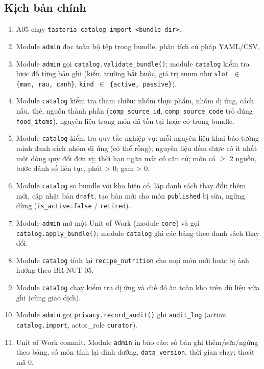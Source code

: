 \subsection{Kịch bản chính}
\begin{enumerate}
\item A05 chạy {\small\texttt{tastoria catalog import <bundle\_\allowbreak{}\allowbreak{}dir>}}.
\item Module {\small\texttt{admin}} đọc toàn bộ tệp trong bundle, phân tích cú pháp YAML/\allowbreak{}CSV.
\item Module {\small\texttt{admin}} gọi {\small\texttt{catalog.\allowbreak{}validate\_\allowbreak{}\allowbreak{}bundle()}}; module {\small\texttt{catalog}} kiểm tra lược đồ từng bản ghi (kiểu, trường bắt buộc, giá trị enum như {\small\texttt{slot \ensuremath{\in} \{man, rau, canh\}}}, {\small\texttt{kind \ensuremath{\in} \{active, passive\}}}).
\item Module {\small\texttt{catalog}} kiểm tra tham chiếu: nhóm thực phẩm, nhóm dị ứng, cách nấu, thẻ, nguồn thành phần ({\small\texttt{comp\_\allowbreak{}\allowbreak{}source\_\allowbreak{}\allowbreak{}id}}, {\small\texttt{comp\_\allowbreak{}\allowbreak{}source\_\allowbreak{}\allowbreak{}code}} trỏ đúng {\small\texttt{food\_\allowbreak{}\allowbreak{}items}}), nguyên liệu trong món đã tồn tại hoặc có trong bundle.
\item Module {\small\texttt{catalog}} kiểm tra quy tắc nghiệp vụ: mỗi nguyên liệu khai báo tường minh danh sách nhóm dị ứng (có thể rỗng); nguyên liệu đếm được có ít nhất một dòng quy đổi đơn vị; thời hạn ngăn mát có căn cứ; món có \ensuremath{\geq} 2 nguồn, bước đánh số liên tục, phút > 0; gam > 0.
\item Module {\small\texttt{catalog}} so bundle với kho hiện có, lập danh sách thay đổi: thêm mới, cập nhật bản {\small\texttt{draft}}, tạo bản mới cho món {\small\texttt{published}} bị sửa, ngừng dùng ({\small\texttt{is\_\allowbreak{}\allowbreak{}active=false}} /\allowbreak{} {\small\texttt{retired}}).
\item Module {\small\texttt{admin}} mở một Unit of Work (module {\small\texttt{core}}) và gọi {\small\texttt{catalog.\allowbreak{}apply\_\allowbreak{}\allowbreak{}bundle()}}; module {\small\texttt{catalog}} ghi các bảng theo danh sách thay đổi.
\item Module {\small\texttt{catalog}} tính lại {\small\texttt{recipe\_\allowbreak{}\allowbreak{}nutrition}} cho mọi món mới hoặc bị ảnh hưởng theo BR-\allowbreak{}NUT-\allowbreak{}05.
\item Module {\small\texttt{catalog}} chạy kiểm tra dị ứng và chế độ ăn toàn kho trên dữ liệu vừa ghi (cùng giao dịch).
\item Module {\small\texttt{admin}} gọi {\small\texttt{privacy.\allowbreak{}record\_\allowbreak{}\allowbreak{}audit()}} ghi {\small\texttt{audit\_\allowbreak{}\allowbreak{}log}} (action {\small\texttt{catalog.\allowbreak{}import}}, actor\_\allowbreak{}role {\small\texttt{curator}}).
\item Unit of Work commit. Module {\small\texttt{admin}} in báo cáo: số bản ghi thêm/\allowbreak{}sửa/\allowbreak{}ngừng theo bảng, số món tính lại dinh dưỡng, {\small\texttt{data\_\allowbreak{}\allowbreak{}version}}, thời gian chạy; thoát mã 0.
\end{enumerate}
